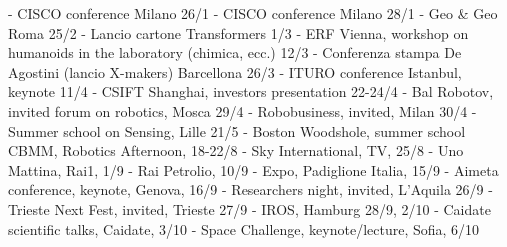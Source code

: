 -          CISCO conference Milano 26/1
-          CISCO conference Milano 28/1
-          Geo & Geo Roma 25/2
-          Lancio cartone Transformers 1/3
-          ERF Vienna, workshop on humanoids in the laboratory (chimica, ecc.) 12/3
-          Conferenza stampa De Agostini (lancio X-makers) Barcellona 26/3
-          ITURO conference Istanbul, keynote 11/4
-          CSIFT Shanghai, investors presentation 22-24/4
-          Bal Robotov, invited forum on robotics, Mosca 29/4
-          Robobusiness, invited, Milan 30/4
-          Summer school on Sensing, Lille 21/5
-          Boston Woodshole, summer school CBMM, Robotics Afternoon, 18-22/8
-          Sky International, TV, 25/8
-          Uno Mattina, Rai1, 1/9
-          Rai Petrolio, 10/9
-          Expo, Padiglione Italia, 15/9
-          Aimeta conference, keynote, Genova, 16/9
-          Researchers night, invited, L’Aquila 26/9
-          Trieste Next Fest, invited, Trieste 27/9
-          IROS, Hamburg 28/9, 2/10
-          Caidate scientific talks, Caidate, 3/10
-          Space Challenge, keynote/lecture, Sofia, 6/10

